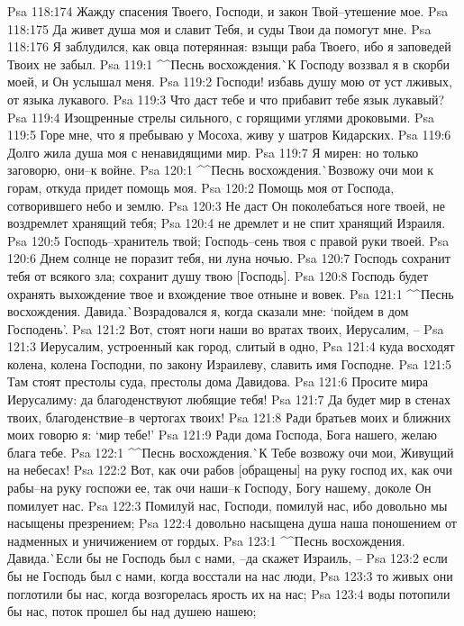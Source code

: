 Psa 118:174  Жажду спасения Твоего, Господи, и закон Твой--утешение мое.
Psa 118:175  Да живет душа моя и славит Тебя, и суды Твои да помогут мне.
Psa 118:176  Я заблудился, как овца потерянная: взыщи раба Твоего, ибо я заповедей Твоих не забыл.
Psa 119:1  ^^Песнь восхождения.^^ К Господу воззвал я в скорби моей, и Он услышал меня.
Psa 119:2  Господи! избавь душу мою от уст лживых, от языка лукавого.
Psa 119:3  Что даст тебе и что прибавит тебе язык лукавый?
Psa 119:4  Изощренные стрелы сильного, с горящими углями дроковыми.
Psa 119:5  Горе мне, что я пребываю у Мосоха, живу у шатров Кидарских.
Psa 119:6  Долго жила душа моя с ненавидящими мир.
Psa 119:7  Я мирен: но только заговорю, они--к войне.
Psa 120:1  ^^Песнь восхождения.^^ Возвожу очи мои к горам, откуда придет помощь моя.
Psa 120:2  Помощь моя от Господа, сотворившего небо и землю.
Psa 120:3  Не даст Он поколебаться ноге твоей, не воздремлет хранящий тебя;
Psa 120:4  не дремлет и не спит хранящий Израиля.
Psa 120:5  Господь--хранитель твой; Господь--сень твоя с правой руки твоей.
Psa 120:6  Днем солнце не поразит тебя, ни луна ночью.
Psa 120:7  Господь сохранит тебя от всякого зла; сохранит душу твою [Господь].
Psa 120:8  Господь будет охранять выхождение твое и вхождение твое отныне и вовек.
Psa 121:1  ^^Песнь восхождения. Давида.^^ Возрадовался я, когда сказали мне: `пойдем в дом Господень'.
Psa 121:2  Вот, стоят ноги наши во вратах твоих, Иерусалим, --
Psa 121:3  Иерусалим, устроенный как город, слитый в одно,
Psa 121:4  куда восходят колена, колена Господни, по закону Израилеву, славить имя Господне.
Psa 121:5  Там стоят престолы суда, престолы дома Давидова.
Psa 121:6  Просите мира Иерусалиму: да благоденствуют любящие тебя!
Psa 121:7  Да будет мир в стенах твоих, благоденствие--в чертогах твоих!
Psa 121:8  Ради братьев моих и ближних моих говорю я: `мир тебе!'
Psa 121:9  Ради дома Господа, Бога нашего, желаю блага тебе.
Psa 122:1  ^^Песнь восхождения.^^ К Тебе возвожу очи мои, Живущий на небесах!
Psa 122:2  Вот, как очи рабов [обращены] на руку господ их, как очи рабы--на руку госпожи ее, так очи наши--к Господу, Богу нашему, доколе Он помилует нас.
Psa 122:3  Помилуй нас, Господи, помилуй нас, ибо довольно мы насыщены презрением;
Psa 122:4  довольно насыщена душа наша поношением от надменных и уничижением от гордых.
Psa 123:1  ^^Песнь восхождения. Давида.^^ Если бы не Господь был с нами, --да скажет Израиль, --
Psa 123:2  если бы не Господь был с нами, когда восстали на нас люди,
Psa 123:3  то живых они поглотили бы нас, когда возгорелась ярость их на нас;
Psa 123:4  воды потопили бы нас, поток прошел бы над душею нашею;
